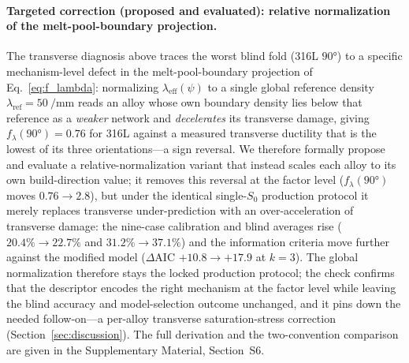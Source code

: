 \documentclass[twocolumn]{sagej}
\begin{document}
\paragraph{Targeted correction (proposed and evaluated): relative normalization of the melt-pool-boundary projection.}
The transverse diagnosis above traces the worst blind fold (316L $\ang{90}$) to a specific mechanism-level defect in the melt-pool-boundary projection of Eq.~\eqref{eq:f_lambda}: normalizing $\lambda_{\mathrm{eff}}(\psi)$ to a single global reference density $\lambda_{\mathrm{ref}}=\SI{50}{\per\milli\meter}$ reads an alloy whose own boundary density lies below that reference as a \emph{weaker} network and \emph{decelerates} its transverse damage, giving $f_\lambda(\ang{90})=0.76$ for 316L against a measured transverse ductility that is the lowest of its three orientations---a sign reversal. We therefore formally propose and evaluate a relative-normalization variant that instead scales each alloy to its own build-direction value; it removes this reversal at the factor level ($f_\lambda(\ang{90})$ moves $0.76\to2.8$), but under the identical single-$S_0$ production protocol it merely replaces transverse under-prediction with an over-acceleration of transverse damage: the nine-case calibration and blind averages rise ($20.4\%\to22.7\%$ and $31.2\%\to37.1\%$) and the information criteria move further against the modified model ($\Delta\mathrm{AIC}$ $+10.8\to+17.9$ at $k=3$). The global normalization therefore stays the locked production protocol; the check confirms that the descriptor encodes the right mechanism at the factor level while leaving the blind accuracy and model-selection outcome unchanged, and it pins down the needed follow-on---a per-alloy transverse saturation-stress correction (Section~\ref{sec:discussion}). The full derivation and the two-convention comparison are given in the Supplementary Material, Section~S6.
\end{document}
